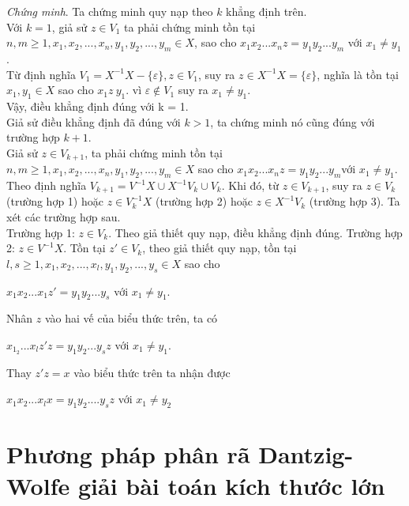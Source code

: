 \begin{flushleft}
\textit{Chứng minh}. Ta chứng minh quy nạp theo $k$ khẳng định trên.\\
\hspace{10mm} Với $k = 1$, giả sử $z \in V_1$ ta phải chứng minh tồn tại $n,m \ge 1, x_1, x_2, ..., x_n, y_1, y_2, ...,y_m \in X$, sao cho $x_1x_2...x_nz = y_1y_2...y_m$ với $x_1 \ne y_1$.\\
\hspace{10mm}Từ định nghĩa $V_1 = X^{-1}X - \{ \varepsilon \}, z\in V_1$, suy ra $z \in X^{-1}X = \{ \varepsilon \}$, nghĩa là tồn tại $x_1, y_1 \in X$ sao cho $x_1z \ y_1$. vì $\varepsilon \not\in V_1$ suy ra $x_1 \ne y_1$. \\
\hspace{10mm}Vậy, điều khẳng định đúng với k = 1.\\
\hspace{10mm}Giả sử điều khẳng định đã đúng với $k > 1$, ta chứng minh nó cũng đúng với trường hợp $k + 1$.\\
\hspace{10mm}Giả sử $z \in V_{k+1}$, ta phải chứng minh tồn tại $n,m \ge 1, x_1, x_2, ... , x_n, y_1, y_2,...,y_m \in X$ sao cho $x_1x_2...x_n z = y_1y_2...y_m$với $x_1 \ne y_1$.\\
\hspace{10mm}Theo định nghĩa $V_{k+1} = V^{-1}X \cup X^{-1}V_k \cup V_k$. Khi đó, từ $z \in V_{k+1}$, suy ra $z \in V_k$ (trường hợp 1) hoặc $z \in V_k^{-1}X$ (trường hợp 2) hoặc $z \in X^{-1}V_k$ (trường hợp 3). Ta xét các trường hợp sau.\\
\hspace{10mm}Trường hợp 1: $z \in V_k$. Theo giả thiết quy nạp, điều khẳng định đúng.
\hspace{10mm}Trường hợp 2: $z \in V^{-1}X$. Tồn tại $z' \in V_k$, theo giả thiết quy nạp, tồn tại $l,s \ge 1,x_1,x_2,...,x_l, y_1, y_2,...,y_s \in X$ sao cho
\end{flushleft}
$x_1x_2...x_1 z' = y_1y_2...y_s$ với $x_1 \ne y_1$.
\begin{flushleft}
Nhân $z$ vào hai vế của biểu thức trên, ta có
\end{flushleft}
$x_1_2...x_l z' z = y_1y_2...y_s z$ với $x_1 \ne y_1$.
\begin{flushleft}
Thay $z'z = x$ vào biểu thức trên ta nhận được
\end{flushleft}
$x_1x_2...x_lx = y_1y_2....y_sz$ với $x_1 \ne y_2$ 



\chapter{Phương pháp phân rã Dantzig-Wolfe giải bài toán kích thước lớn}


